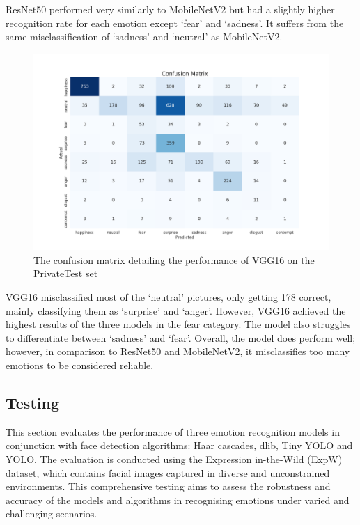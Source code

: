 ResNet50 performed very similarly to MobileNetV2 but had a slightly higher recognition rate for each emotion except `fear' and `sadness'. It suffers from the same misclassification of `sadness' and `neutral' as MobileNetV2.

\begin{figure}[H]
    \centering{}
    \includegraphics[scale=0.38]{fed_images/conf_matrix_VGG16.png}
    \caption{The confusion matrix detailing the performance of VGG16 on the PrivateTest set}
    \label{figure:conf_vgg16}
\end{figure}

VGG16 misclassified most of the `neutral' pictures, only getting 178 correct, mainly classifying them as `surprise' and `anger'. However, VGG16 achieved the highest results of the three models in the fear category. The model also struggles to differentiate between `sadness' and `fear'. Overall, the model does perform well; however, in comparison to ResNet50 and MobileNetV2, it misclassifies too many emotions to be considered reliable.

\subsection{Testing}

This section evaluates the performance of three emotion recognition models in conjunction with face detection algorithms: Haar cascades, dlib, Tiny YOLO and YOLO. The evaluation is conducted using the Expression in-the-Wild (ExpW) dataset, which contains facial images captured in diverse and unconstrained environments. This comprehensive testing aims to assess the robustness and accuracy of the models and algorithms in recognising emotions under varied and challenging scenarios.

